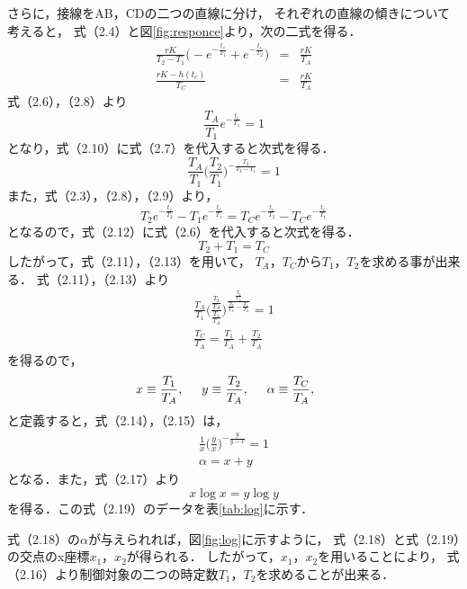 \documentclass[11pt,a4paper]{jsarticle}
\begin{document}
さらに，接線をAB，CDの二つの直線に分け，
それぞれの直線の傾きについて考えると，
式（2.4）と図\ref{fig:responce}より，次の二式を得る．
\begin{eqnarray}
  \frac{r K}{T_2 - T_1} \biggl( - e^{- \frac{t_c}{T_1}} + e^{- \frac{t_c}{T_2}} \biggr) &=& \frac{r K}{T_A} \\
  \frac{r K - h(t_c)}{T_C} &=& \frac{r K}{T_A}
\end{eqnarray}
式（2.6），（2.8）より
\begin{equation}
  \frac{T_A}{T_1} e^{- \frac{t_c}{T_1}} = 1
\end{equation}
となり，式（2.10）に式（2.7）を代入すると次式を得る．
\begin{equation}
  \frac{T_A}{T_1} \biggl( \frac{T_2}{T_1} \biggr) ^{- \frac{T_2}{T_2 - T_1}} = 1
\end{equation}
また，式（2.3），（2.8），（2.9）より，
\begin{equation}
  T_2 e^{- \frac{t_c}{T_2}} - T_1 e^{- \frac{t_c}{T_1}} = T_C e^{- \frac{t_c}{T_2}} - T_C e^{- \frac{t_c}{T_1}}
\end{equation}
となるので，式（2.12）に式（2.6）を代入すると次式を得る．
\begin{equation}
  T_2 + T_1 = T_C
\end{equation}
したがって，式（2.11），（2.13）を用いて，
$T_A$，$T_C$から$T_1$，$T_2$を求める事が出来る．
式（2.11），（2.13）より
\begin{eqnarray}
  \frac{T_A}{T_1} \biggl( \frac{\frac{T_2}{T_A}}{\frac{T_1}{T_A}} \biggr) ^{\frac{\frac{T_2}{T_A}}{\frac{T_2}{T_A} - \frac{T_1}{T_A}}} = 1 \\
  \frac{T_C}{T_A} = \frac{T_1}{T_A} + \frac{T_2}{T_A}
\end{eqnarray}
を得るので，
\begin{equation}
  x \equiv \frac{T_1}{T_A}, \hspace{5mm}
  y \equiv \frac{T_2}{T_A}, \hspace{5mm}
  \alpha \equiv \frac{T_C}{T_A}, \hspace{5mm}
\end{equation}
と定義すると，式（2.14），（2.15）は，
\begin{eqnarray}
  \frac{1}{x} \biggl( \frac{y}{x} \biggr) ^{- \frac{y}{y - x}} = 1 \\
  \alpha = x + y
\end{eqnarray}
となる．また，式（2.17）より
\begin{equation}
  x \log{x} = y \log{y}
\end{equation}
を得る．この式（2.19）のデータを表\ref{tab:log}に示す．

式（2.18）の$\alpha$が与えられれば，図\ref{fig:log}に示すように，
式（2.18）と式（2.19）の交点のx座標$x_1$，$x_2$が得られる．
したがって，$x_1$，$x_2$を用いることにより，
式（2.16）より制御対象の二つの時定数$T_1$，$T_2$を求めることが出来る．\\
\end{document}
